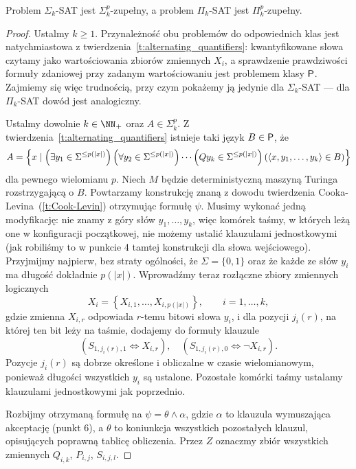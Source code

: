 \begin{theorem}
    Problem $\Sigma_k$-SAT jest $\Sigma_k^p$-zupełny, a problem $\Pi_k$-SAT jest $\Pi_k^p$-zupełny.
\end{theorem}
\begin{proof}
    Ustalmy $k \geq 1$. Przynależność obu problemów do odpowiednich klas jest natychmiastowa z twierdzenia~\ref{t:alternating_quantifiers}: kwantyfikowane słowa czytamy jako wartościowania zbiorów zmiennych $X_i$, a sprawdzenie prawdziwości formuły zdaniowej przy zadanym wartościowaniu jest problemem klasy $\textsf{P}$.
    Zajmiemy się więc trudnością, przy czym pokażemy ją jedynie dla $\Sigma_k$-SAT --- dla $\Pi_k$-SAT dowód jest analogiczny.

    Ustalmy dowolnie $k \in \NN_+$ oraz $A \in \Sigma_k^p$.
    Z twierdzenia~\ref{t:alternating_quantifiers} istnieje taki język $B \in \textsf{P}$, że
    \[ A = \left\{x \mid \left(\exists y_1 \in \Sigma^{\leq p(|x|)}\right) \left(\forall y_2 \in \Sigma^{\leq p(|x|)}\right) \cdots \left(Q y_k \in \Sigma^{\leq p(|x|)}\right) \left(\left\langle x, y_1, \ldots, y_k \right\rangle \in B\right) \right\} \]
    dla pewnego wielomianu $p$.
    Niech $M$ będzie deterministyczną maszyną Turinga rozstrzygającą o $B$.
    Powtarzamy konstrukcję znaną z dowodu twierdzenia Cooka-Levina~(\ref{t:Cook-Levin}) otrzymując formułę $\psi$.
    Musimy wykonać jedną modyfikację: nie znamy z góry słów $y_1, \ldots, y_k$, więc komórek taśmy, w których leżą one w konfiguracji początkowej, nie możemy ustalić klauzulami jednostkowymi (jak robiliśmy to w punkcie 4 tamtej konstrukcji dla słowa wejściowego).
    Przyjmijmy najpierw, bez straty ogólności, że $\Sigma = \{0, 1\}$ oraz że każde ze słów $y_i$ ma długość dokładnie $p(|x|)$.
    Wprowadźmy teraz rozłączne zbiory zmiennych logicznych
    \[ X_i = \left\{X_{i, 1}, \ldots, X_{i, p(|x|)}\right\}, \qquad i = 1, \ldots, k, \]
    gdzie zmienna $X_{i, r}$ odpowiada $r$-temu bitowi słowa $y_i$, i dla pozycji $j_i(r)$, na której ten bit leży na taśmie, dodajemy do formuły klauzule
    \[ \left(S_{1, j_i(r), 1} \Leftrightarrow X_{i, r}\right), \quad \left(S_{1, j_i(r), 0} \Leftrightarrow \neg X_{i, r}\right). \]
    Pozycje $j_i(r)$ są dobrze określone i obliczalne w czasie wielomianowym, ponieważ długości wszystkich $y_i$ są ustalone. Pozostałe komórki taśmy ustalamy klauzulami jednostkowymi jak poprzednio.

    Rozbijmy otrzymaną formułę na $\psi = \theta \land \alpha$, gdzie $\alpha$ to klauzula wymuszająca akceptację (punkt 6), a $\theta$ to koniunkcja wszystkich pozostałych klauzul, opisujących poprawną tablicę obliczenia.
    Przez $Z$ oznaczmy zbiór wszystkich zmiennych $Q_{i, k}$, $P_{i, j}$, $S_{i, j, l}$.


\end{proof}
